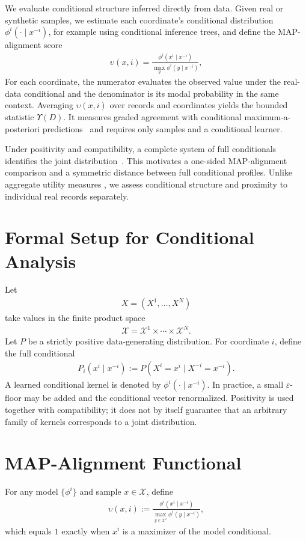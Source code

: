 \documentclass[runningheads]{llncs}
\def\EQSP{3pt}
\newcommand{\cgather}[2][\EQSP]{\begingroup\setlength\abovedisplayskip{#1}\setlength\belowdisplayskip{#1}\begin{gather} #2 \end{gather}\endgroup\noindent}
\begin{document}
We evaluate conditional structure inferred directly from data. Given real or
synthetic samples, we estimate each coordinate's conditional distribution
$\phi^i(\cdot\mid x^{-i})$, for example using conditional inference trees, and
define the MAP-alignment score
\cgather{
\upsilon(x,i)
=
\frac{\phi^i(x^i \mid x^{-i})}{\max_{y} \phi^i(y\mid x^{-i})},
}
%
For each coordinate, the numerator evaluates the observed value under the
real-data conditional and the denominator is its modal probability in the same
context. Averaging $\upsilon(x,i)$ over records and coordinates yields the
bounded statistic $\Upsilon(D)$. It measures graded agreement with conditional
maximum-a-posteriori predictions~\cite{bishop2006pattern} and requires only
samples and a conditional learner.

Under positivity and compatibility, a complete system of full conditionals
identifies the joint distribution~\cite{brook1964,dobrushin1968,hammersley1971,besag1974}.
This motivates a one-sided MAP-alignment comparison and a symmetric distance
between full conditional profiles. Unlike aggregate utility measures
\cite{woo2009global,elemam2020seven,elemam2022utility,dankar2022multidimensional,kaabachi2025scoping},
we assess conditional structure and proximity to individual real records
separately.

\section{Formal Setup for Conditional Analysis}
Let
\cgather{
X=(X^1,\dots,X^N)
}
take values in the finite product space
\cgather{
\mathcal{X}=\mathcal{X}^1\times\cdots\times\mathcal{X}^N.
}
Let $P$ be a strictly positive data-generating distribution. For coordinate
$i$, define the full conditional
\cgather{
P_i(x^i\mid x^{-i})
:=P(X^i=x^i\mid X^{-i}=x^{-i}).
}
A learned conditional kernel is denoted by
$\phi^i(\cdot\mid x^{-i})$. In practice, a small $\varepsilon$-floor may be
added and the conditional vector renormalized. Positivity is used together
with compatibility; it does not by itself guarantee that an arbitrary family
of kernels corresponds to a joint distribution.

\section{MAP-Alignment Functional}
For any model $\{\phi^i\}$ and sample $x\in\mathcal{X}$, define
\cgather{
    \upsilon(x,i)
    :=
    \frac{\phi^i(x^i\mid x^{-i})}
         {\max_{y\in \mathcal{X}^i}
          \phi^i(y\mid x^{-i})},
}
which equals $1$ exactly when $x^i$ is a maximizer of the model conditional.
\end{document}
